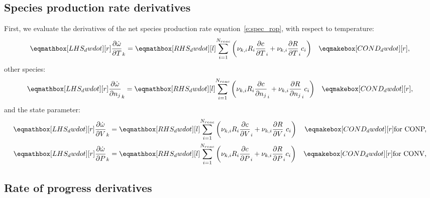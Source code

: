 \documentclass[12pt]{article}
\newcommand{\nr}{N_{reac}}
\newcommand{\conp}{CONP}
\newcommand{\conv}{CONV}
\newcommand{\dconp}{\ifmmode\text{for \conp,}\else for \conp,\fi}
\newcommand{\dconv}{\ifmmode\text{for \conv,}\else for \conv.\fi}
\begin{document}
\subsection{Species production rate derivatives}
\label{s:d_spec_prod}
First, we evaluate the derivatives of the net species production rate equation~\cref{e:spec_rop}, with respect to temperature:
\begin{align}
 \label{e:dwdot_dT}
 \lhs{dwdot}{\frac{\partial \dot{\omega} }{\partial T }_{k}} &= \rhs{dwdot}{\sum_{i=1}^{\nr} \left(\nu_{k,i} R_{i} \frac{\partial c }{\partial T }_{i} + \nu_{k,i} \frac{\partial R }{\partial T }_{i} c_{i}\right)} & \cond{dwdot}{,}
\end{align}
other species:
\begin{align}
 \label{e:dwdot_dnj}
 \lhs{dwdot}{\frac{\partial \dot{\omega} }{\partial {n_j} }_{k}} &= \rhs{dwdot}{\sum_{i=1}^{\nr} \left(\nu_{k,i} R_{i} \frac{\partial c }{\partial {n_j} }_{i} + \nu_{k,i} \frac{\partial R }{\partial {n_j} }_{i} c_{i}\right)} & \cond{dwdot}{,}
\end{align}
and the state parameter:
\begin{subequations}
 \label{e:dwdot_de}
 \begin{align}
  \lhs{dwdot}{\frac{\partial \dot{\omega} }{\partial V }_{k}} &= \rhs{dwdot}{\sum_{i=1}^{\nr} \left(\nu_{k,i} R_{i} \frac{\partial c }{\partial V }_{i} + \nu_{k,i} \frac{\partial R }{\partial V }_{i} c_{i}\right)} & \cond{dwdot}{\dconp}\\
  \lhs{dwdot}{\frac{\partial \dot{\omega} }{\partial P }_{k}} &= \rhs{dwdot}{\sum_{i=1}^{\nr} \left(\nu_{k,i} R_{i} \frac{\partial c }{\partial P }_{i} + \nu_{k,i} \frac{\partial R }{\partial P }_{i} c_{i}\right)} & \cond{dwdot}{\dconv}
 \end{align}
\end{subequations}

\subsection{Rate of progress derivatives}
\end{document}

